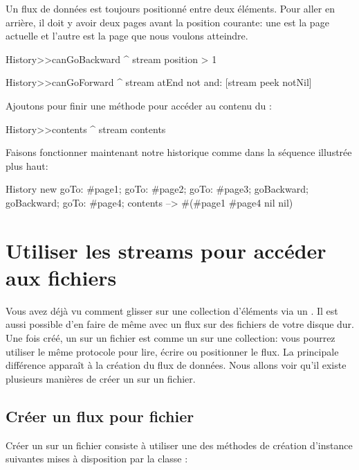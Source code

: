 \documentclass[a4paper,10pt,twoside]{book}
\begin{document}
Un flux de données est toujours positionné entre deux éléments.
Pour aller en arrière, il doit y avoir deux pages avant la position courante:
une est la page actuelle et l'autre est la page que nous voulons atteindre.

\begin{code}{}
History>>canGoBackward
  ^ stream position > 1

History>>canGoForward
  ^ stream atEnd not and: [stream peek notNil]
\end{code}

Ajoutons pour finir une méthode pour accéder au contenu du \stream:
\begin{code}{}
History>>contents
  ^ stream contents
\end{code}

Faisons fonctionner maintenant notre historique 
comme dans la séquence illustrée plus haut:
\begin{code}{}
History new
	goTo: #page1;
	goTo: #page2;
	goTo: #page3;
	goBackward;
	goBackward;
	goTo: #page4;
	contents --> #(#page1 #page4 nil nil)
\end{code}

\section{Utiliser les streams pour accéder aux fichiers}

Vous avez déjà vu comment glisser sur une collection d'éléments via
un \stream. Il est aussi possible d'en faire de même avec un flux 
sur des fichiers de votre disque dur.
Une fois créé, un \stream sur un fichier est comme un \stream sur
une collection: vous pourrez utiliser le même protocole pour lire, écrire
ou positionner le flux.
La principale différence apparaît à la création du flux de données.
Nous allons voir qu'il existe plusieurs manières de créer un \stream sur un fichier.

\subsection{Créer un flux pour fichier}

Créer un \stream sur un fichier consiste à utiliser une des méthodes
de création d'instance suivantes mises à disposition par la classe
:
\end{document}
